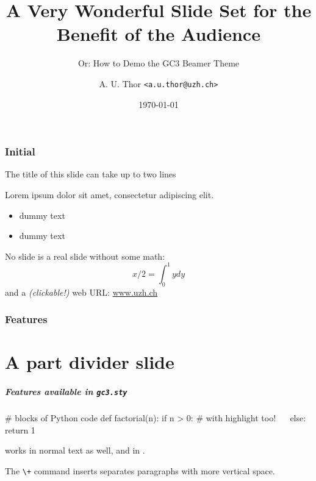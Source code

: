 \documentclass[english,serif,mathserif,usenames,dvipsnames]{beamer}
\begin{document}
\title[A Wonderful Slide Set]{A Very Wonderful Slide Set for the Benefit of the Audience}
\subtitle{Or: How to Demo the GC3 Beamer Theme}
\author{A. U. Thor \texttt{<a.u.thor@uzh.ch>}}
\date{\today}

\maketitle

\section{Initial}
\begin{frame}{The title of this slide can take up to two lines}

  Lorem ipsum dolor sit amet, consectetur adipiscing elit.
  \begin{itemize}
  \item dummy text
  \item dummy text
  \end{itemize}

  No slide is a real slide without some math:
  $$x/2 = \int_{0}^{1} ydy$$
  and a \emph{(clickable!)} web URL: \url{www.uzh.ch}

\end{frame}

\section{Features}
\part{A part divider slide}

\begin{frame}
  \frametitle{Features available in \texttt{gc3.sty}}

  \begin{python}
# blocks of Python code
def factorial(n):
  if n > 0:
    # with highlight too!
    ~~
  else:
    return 1
  \end{python}

  \+
   works in normal text as well, and
  in  .

  \+
  The \lstinline|\+| command inserts separates paragraphs with more
  vertical space.
\end{frame}
\end{document}

